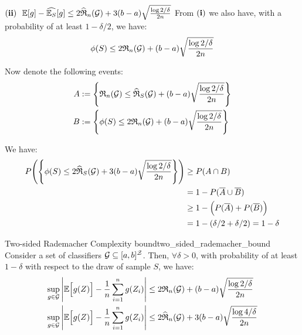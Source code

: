 \begin{proof*}
\begin{subproof}{\newline ${\bf (ii)} \ \ \mathbb{E}[g] - \widehat{\mathbb{E}_S}[g] \le 2\widehat{\mathfrak{R}}_n(\mathcal{G}) + 3(b-a)\sqrt{\frac{\log2/\delta}{2n}}$}
        \noindent From ${\bf (i)}$ we also have, with a probability of at least $1-\delta/2$, we have:
        \begin{align*}
            \phi(S) \le 2\mathfrak{R}_n(\mathcal{G}) + (b-a)\sqrt{
                \frac{\log 2/\delta}{2n}
            }
        \end{align*}

        \noindent Now denote the following events:
        \begin{align*}
            A &:= \Bigg\{ 
                \mathfrak{R}_n(\mathcal{G}) \le \widehat{\mathfrak{R}}_S(\mathcal{G}) + (b-a)\sqrt{ \frac{\log 2/\delta}{2n} }
             \Bigg\} \\
            B &:= \Bigg\{ 
                \phi(S) \le 2 \mathfrak{R}_n(\mathcal{G}) + (b-a)\sqrt{ \frac{\log 2/\delta}{2n} }
             \Bigg\}
        \end{align*}

        \noindent We have:
        \begin{align*}
            P\Bigg( \Bigg\{ 
                \phi(S) \le 2\widehat{\mathfrak{R}}_S(\mathcal{G}) + 3(b-a)\sqrt{
                    \frac{\log 2/\delta}{2n}
                }
             \Bigg\} \Bigg) &\ge P(A\cap B) \\
            &= 1 - P(\overline{A} \cup \overline{B}) \\
            &\ge 1 - \Big( P(\overline{A}) + P(\overline{B}) \Big) \\
            &= 1 - (\delta/2 + \delta/2) = 1 - \delta
        \end{align*}
    \end{subproof}
\end{proof*}

\begin{theorem}{Two-sided Rademacher Complexity bound}{two_sided_rademacher_bound}
    Consider a set of classifiers $\mathcal{G}\subseteq[a,b]^\mathcal{Z}$. Then, $\forall \delta>0$, with probability of at least $1-\delta$ with respect to the draw of sample $S$, we have:
    \begin{align*}
        \sup_{g\in\mathcal{G}}\Bigg| 
            \mathbb{E}\Big[  g(Z)  \Big] - \frac{1}{n}\sum_{i=1}^n g(Z_i)
         \Bigg| &\le 2 \mathfrak{R}_n(\mathcal{G}) + (b-a)\sqrt{
            \frac{\log 2/\delta}{2n}
        } \\
        \sup_{g\in\mathcal{G}}\Bigg| 
            \mathbb{E}\Big[  g(Z)  \Big] - \frac{1}{n}\sum_{i=1}^n g(Z_i)
         \Bigg| &\le 2 \widehat{\mathfrak{R}}_n(\mathcal{G}) + 3(b-a)\sqrt{
            \frac{\log 4/\delta}{2n}
        }
    \end{align*}
\end{theorem}

